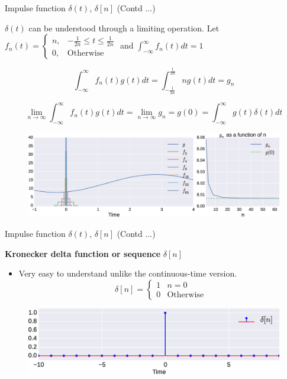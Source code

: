 \documentclass{beamer}
\begin{document}
\begin{frame}{Impulse function $\delta(t)$, $\delta[n]$ (Contd ...)}

$\delta(t)$ can be understood through a limiting operation. Let $f_{n}\left(t\right) = \begin{cases}
n, & -\frac{1}{2n} \leq t \leq \frac{1}{2n} \\
0, & \mathrm{Otherwise}
\end{cases}$ and $\int_{-\infty}^{\infty}f_n(t)dt = 1$

\[\int_{-\infty}^{\infty}f_{n}\left(t\right)g\left(t\right)dt = \int_{-\frac{1}{2n}}^{\frac{1}{2n}}ng\left(t\right)dt = g_n \]

\[\lim_{n\to\infty}\int_{-\infty}^{\infty}f_{n}\left(t\right)g\left(t\right)dt = \lim_{n\to\infty}g_{n} = g\left(0\right) = \int_{-\infty}^{\infty}g(t)\delta(t)dt\]

\begin{figure}
\includegraphics[width=\textwidth]{img/impulse_demo.eps}
\end{figure}
\end{frame}

\begin{frame}{Impulse function $\delta(t)$, $\delta[n]$ (Contd ...)}

\textbf{Kronecker delta function or sequence} $\delta[n]$

\begin{itemize}
\item Very easy to understand unlike the continuous-time version.
\[ \delta[n] = \begin{cases}
1 & n = 0 \\
0 & \mathrm{Otherwise}
\end{cases} \]
\end{itemize}

\begin{figure}
\includegraphics[width=\textwidth]{img/disc_imp.eps}
\end{figure}
\end{frame}
\end{document}
